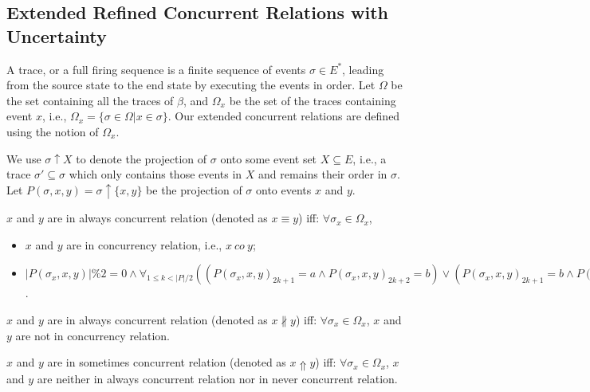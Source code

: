 \documentclass{llncs}
\begin{document}
\subsection{Extended Refined Concurrent Relations with Uncertainty}\label{subsec:concurrent}
A trace, or a full firing sequence is a finite sequence of events $\sigma\in E^{*}$, leading from the source state to the end state by executing the events in order. Let $\Omega$ be the set containing all the traces of $\beta$, and $\Omega_{x}$ be the set of the traces containing event $x$, i.e., $\Omega_{x}=\{\sigma\in\Omega|x\in\sigma\}$. Our extended concurrent relations are defined using the notion of $\Omega_{x}$.

We use $\sigma\uparrow X$ to denote the projection of $\sigma$ onto some event set $X\subseteq E$, i.e., a trace $\sigma'\subseteq\sigma$ which only contains those events in $X$ and remains their order in $\sigma$. Let $P(\sigma,x,y)=\sigma\uparrow\{x,y\}$ be the projection of $\sigma$ onto events $x$ and $y$.

\begin{definition}\label{def:alwaysConcurrent}
$x$ and $y$ are in always concurrent relation (denoted as $x\equiv y$) iff: $\forall\sigma_{x}\in\Omega_{x}$,
	\begin{itemize}
		\item[-] $x$ and $y$ are in concurrency relation, i.e., $x~co~y$;
		\item[-] $|P(\sigma_{x},x,y)|\%2=0\wedge\forall_{1\leq k<|P|/2}((P(\sigma_{x},x,y)_{2k+1}=a\wedge P(\sigma_{x},x,y)_{2k+2}=b)\vee(P(\sigma_{x},x,y)_{2k+1}=b\wedge P(\sigma_{x},x,y)_{2k+2}=a)\vee(P(\sigma_{x},x,y)_{2k+1}=b\wedge P(\sigma_{x},x,y)_{2k+2}=b))$.
	\end{itemize}
\end{definition}

\begin{definition}\label{def:neverConcurrent}
$x$ and $y$ are in always concurrent relation (denoted as $x\nparallel y$) iff: $\forall\sigma_{x}\in\Omega_{x}$, $x$ and $y$ are not in concurrency relation.
\end{definition}

\begin{definition}\label{def:sometimesConcurrent}
$x$ and $y$ are in sometimes concurrent relation (denoted as $x\Uparrow y$) iff: $\forall\sigma_{x}\in\Omega_{x}$, $x$ and $y$ are neither in always concurrent relation nor in never concurrent relation.
\end{definition}
\end{document}
